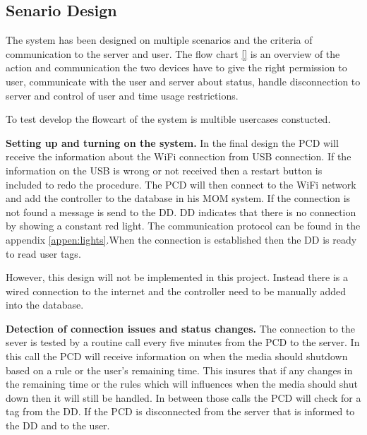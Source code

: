 \subsection{Senario Design}
\label{subsec:senarioD}

The system has been designed on multiple scenarios and the criteria of communication to the server and user. The flow chart \ref{} is an overview of the action and communication the two devices have to give the right permission to user, communicate with the user and server about status, handle disconnection to server and control of user and time usage restrictions.\newline


To test develop the flowcart of the system is multible usercases constucted.\newline


\textbf{Setting up and turning on the system.} \newline
In the final design the PCD will receive the information about the WiFi connection from USB connection.
If the information on the USB is wrong or not received then a restart button is included to redo the procedure.  \newline
The PCD will then connect to the WiFi network and add the controller to the database in his MOM system. If the connection is not found a message is send to the DD. \newline 
DD indicates that there is no connection by showing a constant red light. The communication protocol can be found in the appendix \vref{appen:lights}.\newline When the connection is established then the DD is ready to read user tags.\newline

However, this design will not be implemented in this project. Instead there is a wired connection to the internet and the controller need to be manually added into the database.

\textbf{Detection of connection issues and status changes.} \newline
The connection to the sever is tested by a routine call every five minutes from the PCD to the server. In this call the PCD will receive information on when the media should shutdown based on a rule or the user's remaining time. This insures that if any changes in the remaining time or the rules which will influences when the media should shut down then it will still be handled.
In between those calls the PCD will check for a tag from the DD. If the PCD is disconnected from the server that is informed to the DD and to the user.  \newline
	
